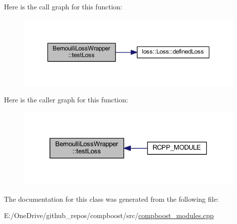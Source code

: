 Here is the call graph for this function\+:\nopagebreak
\begin{figure}[H]
\begin{center}
\leavevmode
\includegraphics[width=347pt]{class_bernoulli_loss_wrapper_a9d3294f43955415ea0a3d80b941a8b2a_cgraph}
\end{center}
\end{figure}
Here is the caller graph for this function\+:\nopagebreak
\begin{figure}[H]
\begin{center}
\leavevmode
\includegraphics[width=318pt]{class_bernoulli_loss_wrapper_a9d3294f43955415ea0a3d80b941a8b2a_icgraph}
\end{center}
\end{figure}


The documentation for this class was generated from the following file\+:\begin{DoxyCompactItemize}
\item 
E\+:/\+One\+Drive/github\+\_\+repos/compboost/src/\mbox{\hyperlink{compboost__modules_8cpp}{compboost\+\_\+modules.\+cpp}}\end{DoxyCompactItemize}
